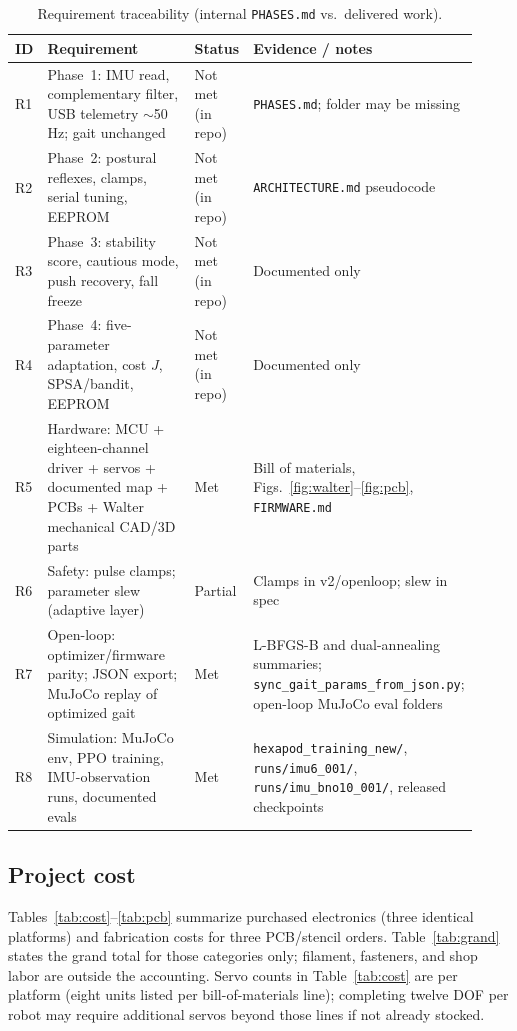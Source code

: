 \documentclass[11pt]{article}
\begin{document}
\begin{table}[htbp]
  \centering
  \caption{Requirement traceability (internal \texttt{PHASES.md} vs.\ delivered work).}
  \label{tab:req}
  \begin{tabular}{@{}p{0.06\linewidth}p{0.36\linewidth}p{0.12\linewidth}p{0.38\linewidth}@{}}
    \toprule
    ID & Requirement & Status & Evidence / notes \\
    \midrule
    R1 & Phase~1: IMU read, complementary filter, USB telemetry $\sim$50\,Hz; gait unchanged & Not met (in repo) & \texttt{PHASES.md}; folder may be missing \\
    R2 & Phase~2: postural reflexes, clamps, serial tuning, EEPROM & Not met (in repo) & \texttt{ARCHITECTURE.md} pseudocode \\
    R3 & Phase~3: stability score, cautious mode, push recovery, fall freeze & Not met (in repo) & Documented only \\
    R4 & Phase~4: five-parameter adaptation, cost $J$, SPSA/bandit, EEPROM & Not met (in repo) & Documented only \\
    R5 & Hardware: MCU + eighteen-channel driver + servos + documented map + PCBs + Walter mechanical CAD/3D parts & Met & Bill of materials, Figs.~\ref{fig:walter}--\ref{fig:pcb}, \texttt{FIRMWARE.md} \\
    R6 & Safety: pulse clamps; parameter slew (adaptive layer) & Partial & Clamps in v2/openloop; slew in spec \\
    R7 & Open-loop: optimizer/firmware parity; JSON export; MuJoCo replay of optimized gait & Met & L-BFGS-B and dual-annealing summaries; \texttt{sync\_gait\_params\_from\_json.py}; open-loop MuJoCo eval folders \\
    R8 & Simulation: MuJoCo env, PPO training, IMU-observation runs, documented evals & Met & \texttt{hexapod\_training\_new/}, \texttt{runs/imu6\_001/}, \texttt{runs/imu\_bno10\_001/}, released checkpoints \\
    \bottomrule
  \end{tabular}
\end{table}

\subsection{Project cost}
Tables~\ref{tab:cost}--\ref{tab:pcb} summarize purchased electronics (three identical platforms) and fabrication costs for three PCB/stencil orders. Table~\ref{tab:grand} states the grand total for those categories only; filament, fasteners, and shop labor are outside the accounting. Servo counts in Table~\ref{tab:cost} are per platform (eight units listed per bill-of-materials line); completing twelve DOF per robot may require additional servos beyond those lines if not already stocked.
\end{document}
